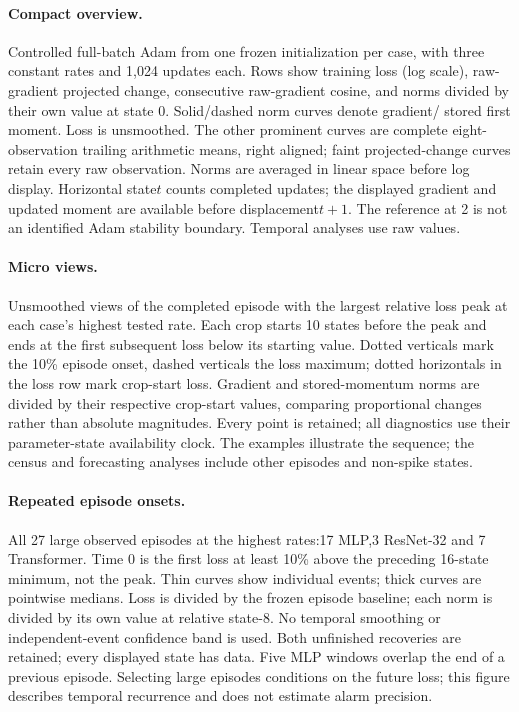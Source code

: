 \paragraph{Compact overview.}
Controlled full-batch Adam from one frozen initialization per case, with three
constant rates and 1,024 updates each. Rows show training loss (log scale),
raw-gradient projected change, consecutive raw-gradient cosine, and norms
divided by their own value at state 0. Solid/dashed norm curves denote gradient/
stored first moment. Loss is unsmoothed. The other prominent curves are complete
eight-observation trailing arithmetic means, right aligned; faint projected-change
curves retain every raw observation. Norms are averaged in linear space before
log display. Horizontal state$t$ counts completed updates; the displayed gradient
and updated moment are available before displacement$t+1$. The reference at 2
is not an identified Adam stability boundary. Temporal analyses use raw values.

\paragraph{Micro views.}
Unsmoothed views of the completed episode with the largest relative loss peak
at each case's highest tested rate. Each crop starts 10 states before the peak
and ends at the first subsequent loss below its starting value. Dotted verticals
mark the 10\% episode onset, dashed verticals the loss maximum; dotted horizontals
in the loss row mark crop-start loss. Gradient and stored-momentum norms are
divided by their respective crop-start values, comparing proportional changes
rather than absolute magnitudes. Every point is retained; all diagnostics use
their parameter-state availability clock. The examples illustrate the sequence;
the census and forecasting analyses include other episodes and non-spike states.

\paragraph{Repeated episode onsets.}
All 27 large observed episodes at the highest rates:17 MLP,3 ResNet-32 and 7
Transformer. Time 0 is the first loss at least 10\% above the preceding 16-state
minimum, not the peak. Thin curves show individual events; thick curves are
pointwise medians. Loss is divided by the frozen episode baseline; each norm
is divided by its own value at relative state-8. No temporal smoothing or
independent-event confidence band is used. Both unfinished recoveries are
retained; every displayed state has data. Five MLP windows overlap the end of
a previous episode. Selecting large episodes conditions on the future loss;
this figure describes temporal recurrence and does not estimate alarm precision.

